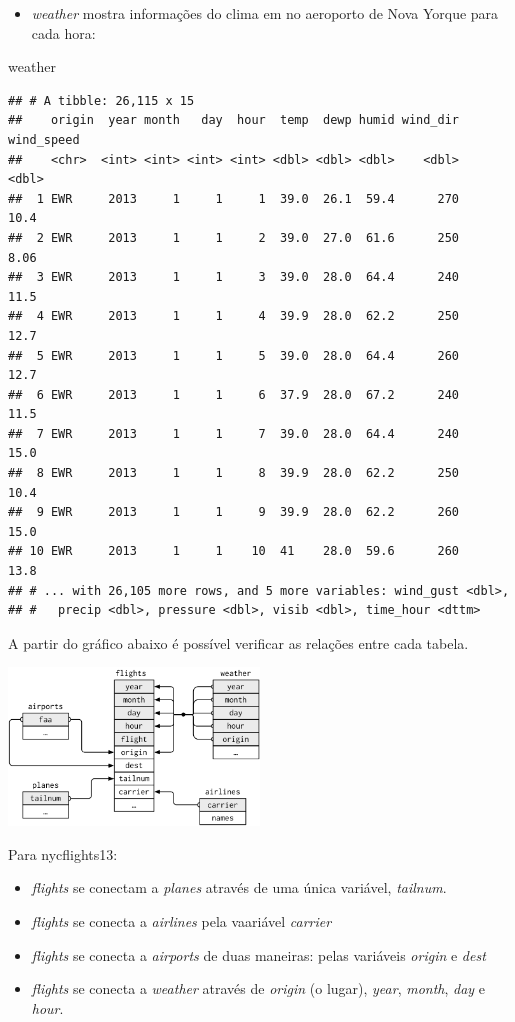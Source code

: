 \documentclass[
]{article}
\newenvironment{Shaded}{\begin{snugshade}}{\end{snugshade}}
\newcommand{\NormalTok}[1]{#1}
\providecommand{\tightlist}{%
  \setlength{\itemsep}{0pt}\setlength{\parskip}{0pt}}
\begin{document}
\begin{itemize}
\tightlist
\item
  \emph{weather} mostra informações do clima em no aeroporto de Nova
  Yorque para cada hora:
\end{itemize}

\begin{Shaded}
\begin{Highlighting}[]
\NormalTok{weather}
\end{Highlighting}
\end{Shaded}

\begin{verbatim}
## # A tibble: 26,115 x 15
##    origin  year month   day  hour  temp  dewp humid wind_dir wind_speed
##    <chr>  <int> <int> <int> <int> <dbl> <dbl> <dbl>    <dbl>      <dbl>
##  1 EWR     2013     1     1     1  39.0  26.1  59.4      270      10.4 
##  2 EWR     2013     1     1     2  39.0  27.0  61.6      250       8.06
##  3 EWR     2013     1     1     3  39.0  28.0  64.4      240      11.5 
##  4 EWR     2013     1     1     4  39.9  28.0  62.2      250      12.7 
##  5 EWR     2013     1     1     5  39.0  28.0  64.4      260      12.7 
##  6 EWR     2013     1     1     6  37.9  28.0  67.2      240      11.5 
##  7 EWR     2013     1     1     7  39.0  28.0  64.4      240      15.0 
##  8 EWR     2013     1     1     8  39.9  28.0  62.2      250      10.4 
##  9 EWR     2013     1     1     9  39.9  28.0  62.2      260      15.0 
## 10 EWR     2013     1     1    10  41    28.0  59.6      260      13.8 
## # ... with 26,105 more rows, and 5 more variables: wind_gust <dbl>,
## #   precip <dbl>, pressure <dbl>, visib <dbl>, time_hour <dttm>
\end{verbatim}

A partir do gráfico abaixo é possível verificar as relações entre cada
tabela.

\includegraphics[width=0.5\textwidth,height=\textheight]{relational-nycflights.png}

Para nycflights13:

\begin{itemize}
\item
  \emph{flights} se conectam a \emph{planes} através de uma única
  variável, \emph{tailnum}.
\item
  \emph{flights} se conecta a \emph{airlines} pela vaariável
  \emph{carrier}
\item
  \emph{flights} se conecta a \emph{airports} de duas maneiras: pelas
  variáveis \emph{origin} e \emph{dest}
\item
  \emph{flights} se conecta a \emph{weather} através de \emph{origin} (o
  lugar), \emph{year}, \emph{month}, \emph{day} e \emph{hour}.
\end{itemize}
\end{document}
